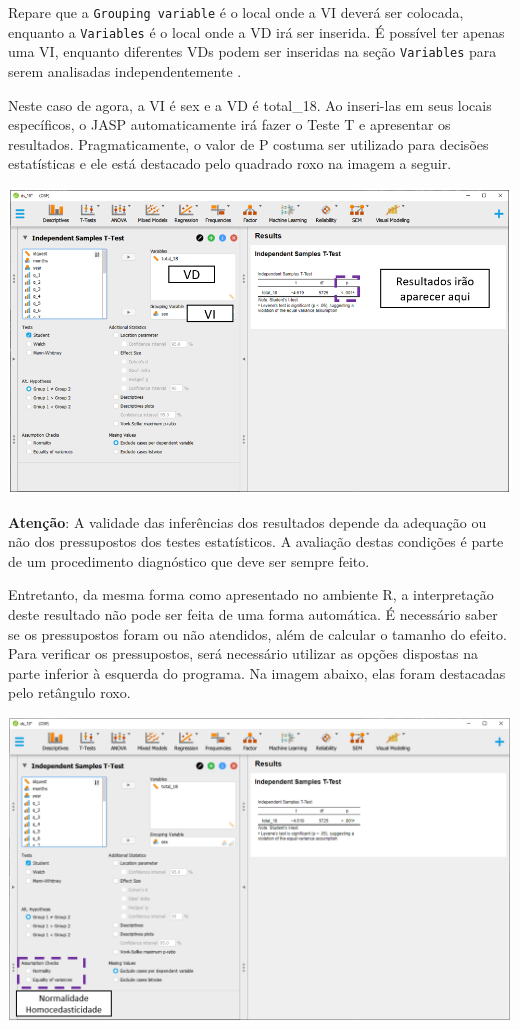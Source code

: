 \documentclass[
]{book}
\begin{document}
Repare que a \texttt{Grouping\ variable} é o local onde a VI deverá ser colocada, enquanto a \texttt{Variables} é o local onde a VD irá ser inserida. É possível ter apenas uma VI, enquanto diferentes VDs podem ser inseridas na seção \texttt{Variables} para serem analisadas independentemente .

Neste caso de agora, a VI é sex e a VD é total\_18. Ao inseri-las em seus locais específicos, o JASP automaticamente irá fazer o Teste T e apresentar os resultados. Pragmaticamente, o valor de P costuma ser utilizado para decisões estatísticas e ele está destacado pelo quadrado roxo na imagem a seguir.

\includegraphics{./img/cap_testet_resultados_iniciais.png}

\textbf{Atenção}: A validade das inferências dos resultados depende da adequação ou não dos pressupostos dos testes estatísticos. A avaliação destas condições é parte de um procedimento diagnóstico que deve ser sempre feito.

Entretanto, da mesma forma como apresentado no ambiente R, a interpretação deste resultado não pode ser feita de uma forma automática. É necessário saber se os pressupostos foram ou não atendidos, além de calcular o tamanho do efeito. Para verificar os pressupostos, será necessário utilizar as opções dispostas na parte inferior à esquerda do programa. Na imagem abaixo, elas foram destacadas pelo retângulo roxo.

\includegraphics{./img/cap_testet_pressupostos.png}
\end{document}
